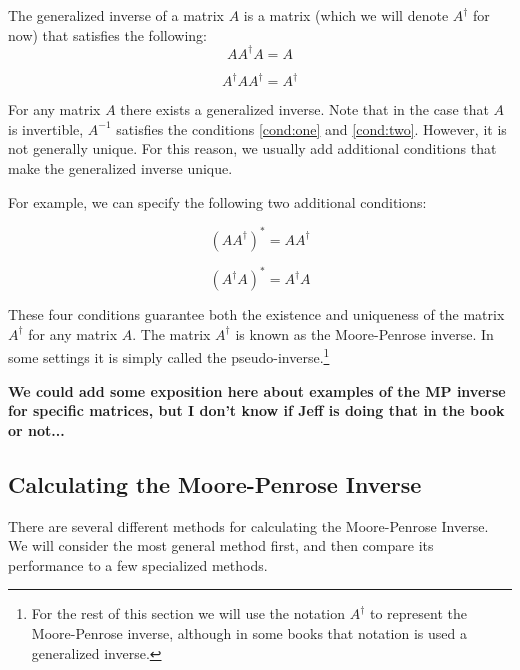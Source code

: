 
 
The generalized inverse of a matrix $A$ is a matrix (which we will denote $A^\dagger$ for now) that satisfies the following:
\begin{equation} \label{cond:one}
AA^\dagger A = A 
\end{equation}

\begin{equation} \label{cond:two}
A^\dagger A A^\dagger = A^\dagger 
\end{equation}

For any matrix $A$ there exists a generalized inverse. Note that in the case that $A$ is invertible, $A^{-1}$ satisfies the conditions \ref{cond:one} and \ref{cond:two}. However, it is not generally unique. For this reason, we usually add additional conditions that make the generalized inverse unique.

For example, we can specify the following two additional conditions:

\begin{equation} \label{cond:three}
(AA^\dagger)^* = AA^\dagger
\end{equation}

\begin{equation} \label{cond:four}
(A^\dagger A)^* = A^\dagger A
\end{equation}

These four conditions guarantee both the existence and uniqueness of the matrix $A^\dagger$ for any matrix $A$. The matrix $A^\dagger$ is known as the Moore-Penrose inverse. In some settings it is simply called the pseudo-inverse.\footnote{For the rest of this section we will use the notation $A^\dagger$ to represent the Moore-Penrose inverse, although in some books that notation is used a generalized inverse.}

{\bf We could add some exposition here about examples of the MP inverse for specific matrices, but I don't know if Jeff is doing that in the book or not...}

\subsection{Calculating the Moore-Penrose Inverse}

There are several different methods for calculating the Moore-Penrose Inverse. We will consider the most general method first, and then compare its performance to a few specialized methods.

